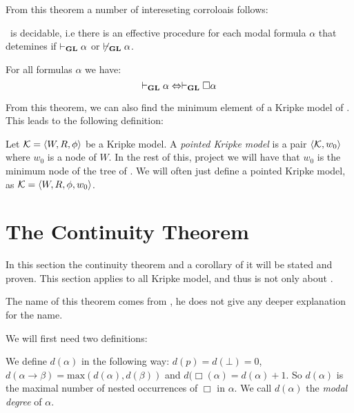 \documentclass[../main.tex]{subfiles}
\begin{document}
From this theorem a number of intereseting corroloais follows: 

\begin{cor}
	\GL\ is decidable, i.e there is an effective procedure for each modal formula
	$\alpha$ that detemines if $\vdash_{\text{\textbf{GL}}}\alpha$ or
	$\not\vdash_{\text{\textbf{GL}}}\alpha$.
\end{cor}
\begin{cor}
	\label{cor:Nec}
	For all formulas $\alpha$ we have:
	\[\vdash_{\text{\textbf{GL}}}\alpha\Leftrightarrow\vdash_{\text{\textbf{GL}}}\Box\alpha\]
\end{cor}

From this theorem, we can also find the minimum element of a Kripke model of
\GL. This leads to the following definition:

\begin{defi}
	Let $\mathcal{K}=\langle W,R,\phi\rangle$ be a Kripke model. A \textit{pointed
	Kripke model} is a pair $\langle \mathcal{K},w_0\rangle$ where $w_0$ is a node
	of $W$. In the rest of this, project we will have that $w_0$ is the
	minimum node of the tree of \GL. We will often just define a pointed
	Kripke model, as $\mathcal{K}=\langle W,R,\phi,w_0\rangle$.
\end{defi}

\section{The Continuity Theorem}
In this section the continuity theorem and a corollary of it will be stated and
proven. This section applies to all Kripke model, and thus is not only about
\GL.

The name of this theorem comes from \parencite{Boolos1993}, he does not give
any deeper explanation for the name.

We will first need two definitions:
\begin{defi}
	We define $d(\alpha)$ in the following way: $d(p)=d(\bot)=0$,
	$d(\alpha\rightarrow\beta)=\text{max}(d(\alpha),d(\beta))$ and
	$d(\Box(\alpha)=d(\alpha)+1$. So $d(\alpha)$ is the maximal number of
	nested occurrences of $\Box$ in $\alpha$. We call $d(\alpha)$ the
	\textit{modal
	degree} of $\alpha$.
\end{defi}
\end{document}
